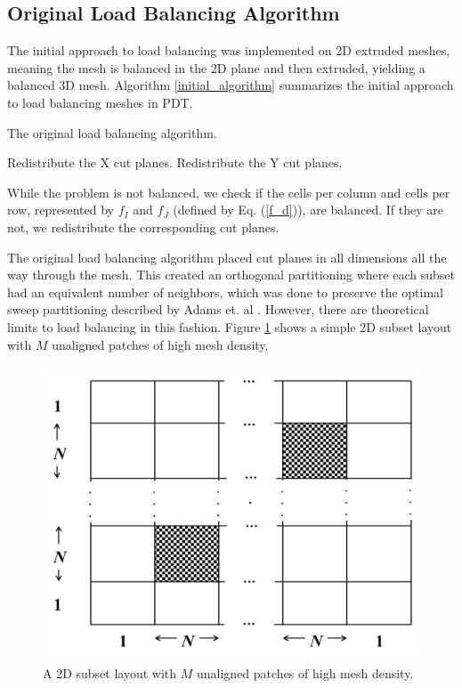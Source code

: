 \documentclass[letterpaper]{mandc2019}
\begin{document}
\subsection{Original Load Balancing Algorithm}

The initial approach to load balancing was implemented on 2D extruded meshes, meaning the mesh is balanced in the 2D plane and then extruded, yielding a balanced 3D mesh. Algorithm \ref{initial_algorithm} summarizes the initial approach to load balancing meshes in PDT.

\begin{algorithm}[!htb]
\caption{The original load balancing algorithm.}
\label{initial_algorithm}
\begin{algorithmic}

    \STATE Redistribute the X cut planes.
  \ENDIF
  	\STATE Redistribute the Y cut planes.
  \ENDIF
\ENDWHILE
\end{algorithmic}
\end{algorithm}
While the problem is not balanced, we check if the cells per column and cells per row, represented by $f_I$ and $f_J$ (defined by Eq. (\ref{f_d})), are balanced. If they are not, we redistribute the corresponding cut planes.

The original load balancing algorithm placed cut planes in all dimensions all the way through the mesh. This created an orthogonal partitioning where each subset had an equivalent number of neighbors, which was done to preserve the optimal sweep partitioning described by Adams et. al \cite{mpadams2015}. However, there are theoretical limits to load balancing in this fashion. Figure \ref{2dgeneral} shows a simple 2D subset layout with $M$ unaligned patches of high mesh density.

\begin{figure}[!htb]
\centering
\includegraphics[scale=0.4]{Figures/2dgeneral.png}
\caption{A 2D subset layout with $M$ unaligned patches of high mesh density.}
\label{2dgeneral}
\end{figure}
\end{document}
